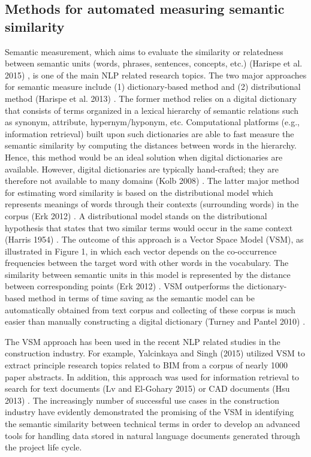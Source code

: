 \documentclass[Journal, InsideFigs, DoubleSpace]{ascelike} %
\begin{document}
\subsection{Methods for automated measuring semantic similarity}
Semantic measurement, which aims to evaluate the similarity or relatedness between semantic units (words, phrases, sentences, concepts, etc.) (Harispe et al. 2015) \cite{harispe15}, is one of the main NLP related research topics. The two major approaches for semantic measure include (1) dictionary-based method and (2) distributional method (Harispe et al. 2013) \cite{harispe13}.  The former method relies on a digital dictionary that consists of terms organized in a lexical hierarchy of semantic relations such as synonym, attribute, hypernym/hyponym, etc. Computational platforms (e.g., information retrieval) built upon such dictionaries are able to fast measure the semantic similarity by computing the distances between words in the hierarchy. Hence, this method would be an ideal solution when digital dictionaries are available. However, digital dictionaries are typically hand-crafted; they are therefore not available to many domains (Kolb 2008) \cite{kolb08}. The latter major method for estimating word similarity is based on the distributional model which represents meanings of words through their contexts (surrounding words) in the corpus (Erk 2012) \cite{erk12}. A distributional model stands on the distributional hypothesis that states that two similar terms would occur in the same context (Harris 1954) \cite{harris54}. The outcome of this approach is a Vector Space Model (VSM), as illustrated in Figure 1, in which each vector depends on the co-occurrence frequencies between the target word with other words in the vocabulary. The similarity between semantic units in this model is represented by the distance between corresponding points (Erk 2012) \cite{erk12}. VSM outperforms the dictionary-based method in terms of time saving as the semantic model can be automatically obtained from text corpus and collecting of these corpus is much easier than manually constructing a digital dictionary (Turney and Pantel 2010) \cite{turney10}.
\par
The VSM approach has been used in the recent NLP related studies in the construction industry. For example, Yalcinkaya and Singh (2015) \cite{yalcinkaya15} utilized VSM to extract principle research topics related to BIM from a corpus of nearly 1000 paper abstracts. In addition, this approach was used for information retrieval to search for text documents (Lv and El-Gohary 2015) \cite{lv15} or CAD documents (Hsu 2013) \cite{hsu13}. The increasingly number of successful use cases in the construction industry have evidently demonstrated the promising of the VSM in identifying the semantic similarity between technical terms in order to develop an advanced tools for handling data stored in natural language documents generated through the project life cycle.
\end{document}
